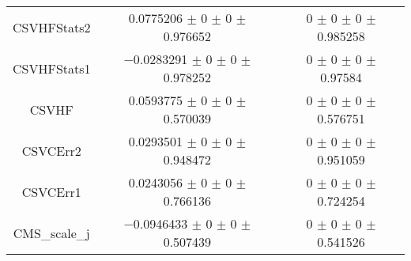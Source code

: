 \begin{table}
\begin{tabular}{ccc}
CSVHFStats2 	& \num{0.0775206} $\pm$ \num{0} $\pm$ \num{0} $\pm$ \num{0.976652} 	& \num{0} $\pm$ \num{0} $\pm$ \num{0} $\pm$ \num{0.985258}\\
CSVHFStats1 	& \num{-0.0283291} $\pm$ \num{0} $\pm$ \num{0} $\pm$ \num{0.978252} 	& \num{0} $\pm$ \num{0} $\pm$ \num{0} $\pm$ \num{0.97584}\\
CSVHF 	& \num{0.0593775} $\pm$ \num{0} $\pm$ \num{0} $\pm$ \num{0.570039} 	& \num{0} $\pm$ \num{0} $\pm$ \num{0} $\pm$ \num{0.576751}\\
CSVCErr2 	& \num{0.0293501} $\pm$ \num{0} $\pm$ \num{0} $\pm$ \num{0.948472} 	& \num{0} $\pm$ \num{0} $\pm$ \num{0} $\pm$ \num{0.951059}\\
CSVCErr1 	& \num{0.0243056} $\pm$ \num{0} $\pm$ \num{0} $\pm$ \num{0.766136} 	& \num{0} $\pm$ \num{0} $\pm$ \num{0} $\pm$ \num{0.724254}\\
CMS\_scale\_j 	& \num{-0.0946433} $\pm$ \num{0} $\pm$ \num{0} $\pm$ \num{0.507439} 	& \num{0} $\pm$ \num{0} $\pm$ \num{0} $\pm$ \num{0.541526}\\
\bottomrule
\end{tabular}
\end{table}